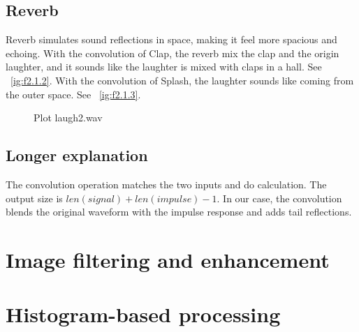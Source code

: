 \documentclass[12pt]{article}
\begin{document}
\subsection{Reverb}

Reverb simulates sound reflections in space, making it feel more spacious and echoing.
With the convolution of Clap, the reverb mix the clap and the origin laughter, and it sounds like the laughter is mixed with claps in a hall. See ~\ref{ig:f2.1.2}.
With the convolution of Splash, the laughter sounds like coming from the outer space.  See ~\ref{ig:f2.1.3}.


\begin{figure}[ht]
\centering
{}

\caption[]{Plot laugh2.wav}
\label{fig:2.1}
\end{figure}

\subsection{Longer explanation}

The convolution operation matches the two inputs and do calculation. The output size is $len(signal)+len(impulse)-1$. In our case, the convolution blends the original waveform with the impulse response and adds tail reflections.

\section{Image filtering and enhancement}

\section{Histogram-based processing}
\end{document}
